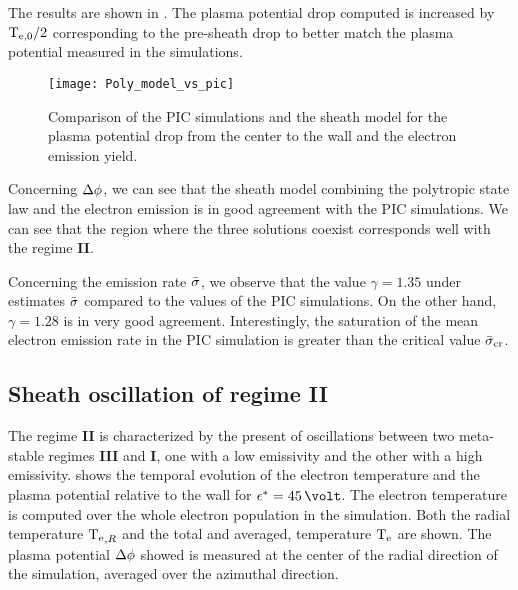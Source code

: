     The results are shown in .
    The plasma potential drop computed is increased by $\mathrm{T_{e, 0}}/2$ corresponding to the pre-sheath drop to better match the plasma potential measured in the simulations.

    \begin{figure}[hbtp]
      \centering
      \texttt{[image: Poly\_model\_vs\_pic]}
      \caption{Comparison of the PIC simulations and the sheath model for the plasma potential drop from the center to the wall and the electron emission yield. }
      \label{fig-Poly_model_vs_pic}
    \end{figure}

    Concerning $\Delta \phi$, we can see that the sheath model combining the polytropic state law and the electron emission is in good agreement with the \ac{PIC} simulations.
    We can see that the region where the three solutions coexist corresponds well with the regime {\bf II}.

    Concerning the emission rate $ \bar{\sigma }$, we observe that the value $\gamma=1.35$ under estimates $ \bar{\sigma }$ compared to the values of the \ac{PIC} simulations.
    On the other hand, $\gamma=1.28$ is in very good agreement.
    Interestingly, the saturation of the mean electron emission rate in the \ac{PIC} simulation is greater than the critical value $ \bar{\sigma }_{\rm cr}$.
    
    
  \subsection{Sheath oscillation of regime {\bf II}} \label{subsec-pic_scheath_RSO}
  
    The regime {\bf II} is characterized by the present of oscillations between two meta-stable regimes {\bf III} and {\bf I}, one with a low emissivity and the other with a high emissivity.
     shows the temporal evolution of the electron temperature and the plasma potential relative to the wall for $\crover=45\,\volt$.
    The electron temperature is computed over the whole electron population in the simulation.
    Both the radial temperature $\mathrm{T_e}_{,R}$ and the total and averaged, temperature $\mathrm{T_e}$ are shown.
    The plasma potential $\Delta \phi$ showed is measured at the center of the radial direction of the simulation, averaged over the azimuthal direction.
    

